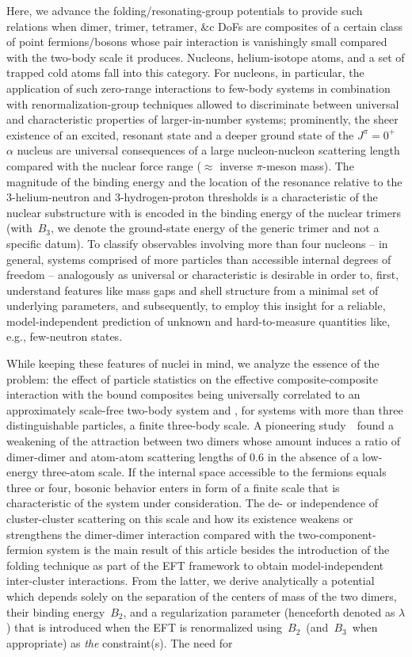 \documentclass[preprint,aps,onecolumn,preprintnumbers,amsmath,amssymb,nofootinbib,superscriptaddress]{revtex4-1}
\newcommand{\bd}{\ensuremath{B_2}}
\newcommand{\bt}{\ensuremath{B_3}}
\begin{document}
Here, we advance the folding/resonating-group potentials to provide such relations when dimer, trimer, tetramer, \&c DoFs
are composites of a certain class of point fermions/bosons whose pair interaction is vanishingly small compared with the
two-body scale it produces. Nucleons, helium-isotope atoms, and a set of trapped cold atoms fall into this category. For nucleons,
in particular, the application of such zero-range interactions to few-body systems in combination with renormalization-group techniques
allowed to discriminate between universal and characteristic properties of larger-in-number systems; prominently, the 
sheer existence of an excited, resonant state and a deeper ground state of the $J^\pi=0^+$ $\alpha$ nucleus are universal
consequences of a large nucleon-nucleon scattering length compared with the nuclear force range ($\approx$ inverse $\pi$-meson mass).
The magnitude of the binding energy and the location of the resonance relative to the 3-helium-neutron and 3-hydrogen-proton thresholds
is a characteristic of the nuclear substructure with is encoded in the binding energy of the nuclear trimers (with~\bt, we denote the
ground-state energy of the generic trimer and not a specific datum).
To classify observables involving more than four nucleons -- in general, systems comprised of more particles than accessible internal
degrees of freedom -- analogously as universal or characteristic is desirable in order to, first, understand features like mass gaps
and shell structure from a minimal set of underlying parameters, and subsequently, to employ this insight for a reliable, model-independent
prediction of unknown and hard-to-measure quantities like, e.g., few-neutron states.

While keeping these features of nuclei in mind, we analyze the essence of the problem: the effect of particle statistics on the effective
composite-composite interaction with the bound composites being universally correlated to an approximately scale-free two-body system and
, for systems with more than three distinguishable particles, a finite three-body scale. A pioneering study~\cite{Petrov_2004}~found a weakening
of the attraction between two dimers whose amount induces a ratio of dimer-dimer and atom-atom scattering lengths of $0.6$ in the absence of
a low-energy three-atom scale. If the internal space accessible to the fermions equals three or four, bosonic behavior enters in form of a finite
scale that is characteristic of the system under consideration. The de- or independence of cluster-cluster scattering on this scale and how its
existence weakens or strengthens the dimer-dimer interaction compared with the two-component-fermion system is the main result of this article
besides the introduction of the folding technique as part of the EFT framework to obtain model-independent inter-cluster interactions.
From the latter, we derive analytically a potential which depends solely on the separation of the centers of mass of the two dimers, their binding
energy~\bd, and a regularization parameter (henceforth denoted as $\lambda$) that is introduced when the EFT is renormalized using~\bd~(and~\bt~when
appropriate) as {\it the} constraint(s). The need for 
\end{document}
